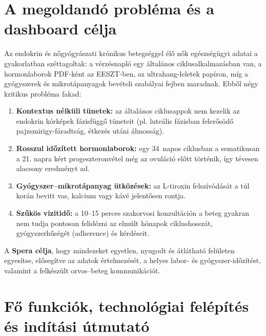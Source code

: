 \documentclass[10pt,a4paper]{article}
\begin{document}
\section{A megoldandó probléma és a dashboard célja}

Az endokrin és nőgyógyászati krónikus betegséggel élő nők egészségügyi adatai a gyakorlatban széttagoltak: a vérzésnapló egy általános ciklusalkalmazásban van, a hormonlaborok PDF-ként az EESZT-ben, az ultrahang-leletek papíron, míg a gyógyszerek és mikrotápanyagok bevételi szabályai fejben maradnak. Ebből négy kritikus probléma fakad:
\begin{enumerate}
  \item \textbf{Kontextus nélküli tünetek:} az általános ciklusappok nem kezelik az endokrin kórképek fázisfüggő tüneteit (pl. luteális fázisban felerősödő pajzsmirigy-fáradtság, étkezés utáni álmosság).
  \item \textbf{Rosszul időzített hormonlaborok:} egy 34~napos ciklusban a sematikusan a 21. napra kért progeszteronvétel még az ovuláció előtt történik, így tévesen alacsony eredményt ad.
  \item \textbf{Gyógyszer--mikrotápanyag ütközések:} az L-tiroxin felszívódását a túl korán bevitt vas, kalcium vagy kávé jelentősen rontja.
  \item \textbf{Szűkös vizitidő:} a 10--15 perces szakorvosi konzultáción a beteg gyakran nem tudja pontosan felidézni az elmúlt hónapok ciklushosszát, gyógyszerhűségét (adherence) és kérdéseit.
\end{enumerate}

A \textbf{Spera célja}, hogy mindezeket egyetlen, nyugodt és átlátható felületen egyesítse, elősegítve az adatok értelmezését, a helyes labor- és gyógyszer-időzítést, valamint a felkészült orvos--beteg kommunikációt.

\section{Fő funkciók, technológiai felépítés és indítási útmutató}
\end{document}
